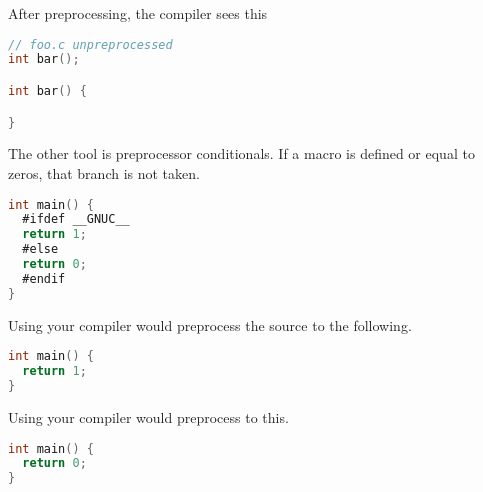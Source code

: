 After preprocessing, the compiler sees this

\begin{lstlisting}[language=C]
// foo.c unpreprocessed
int bar();

int bar() {

}
\end{lstlisting}

The other tool is \gls{preprocessor conditionals}.
If a macro is defined or equal to zeros, that branch is not taken.

\begin{lstlisting}[language=C]
int main() {
  #ifdef __GNUC__
  return 1;
  #else
  return 0;
  #endif
}
\end{lstlisting}

Using  your compiler would preprocess the source to the following.

\begin{lstlisting}[language=C]
int main() {
  return 1;
}
\end{lstlisting}

Using  your compiler would preprocess to this.

\begin{lstlisting}[language=C]
int main() {
  return 0;
}
\end{lstlisting}


